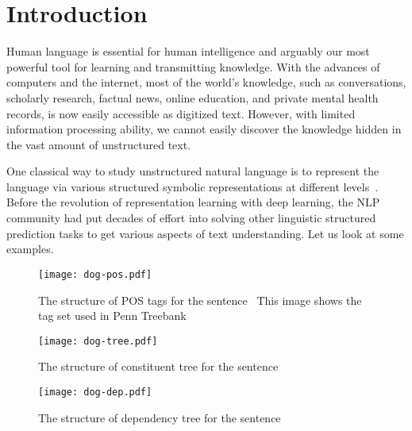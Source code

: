 
\chapter{Introduction}
\label{chap:intro}

Human language is essential for human intelligence and arguably our
most powerful tool for learning and transmitting knowledge. With the
advances of computers and the internet, most of the world's knowledge,
such as conversations, scholarly research, factual news, online
education, and private mental health records, is now easily accessible
as digitized text. However, with limited information processing
ability, we cannot easily discover the knowledge hidden in the vast
amount of unstructured text.

One classical way to study unstructured natural language is to
represent the language via various structured symbolic representations
at different levels~\citep{smith2011linguistic}. Before the revolution
of representation learning with deep learning, the NLP community had
put decades of effort into solving other linguistic structured
prediction tasks to get various aspects of text understanding. Let us
look at some examples.

\begin{figure}[!th]
\centering
\texttt{[image: dog-pos.pdf]}
\caption{\label{fig:intro:dog-pos}The structure of POS tags for the
  sentence \emph{}~This image shows the tag set used in Penn
  Treebank~\cite{marcus-etal-1994-penn} }
\end{figure}

\begin{figure}[!th]
\centering
\texttt{[image: dog-tree.pdf]}
\caption{\label{fig:intro:dog-tree}The structure of constituent tree
  for the sentence~\emph{}}
\end{figure}

\begin{figure}[!th]
\centering
\texttt{[image: dog-dep.pdf]}
\caption{\label{fig:intro:dog-dep}The structure of dependency tree for
  the sentence \emph{}}
\end{figure}

